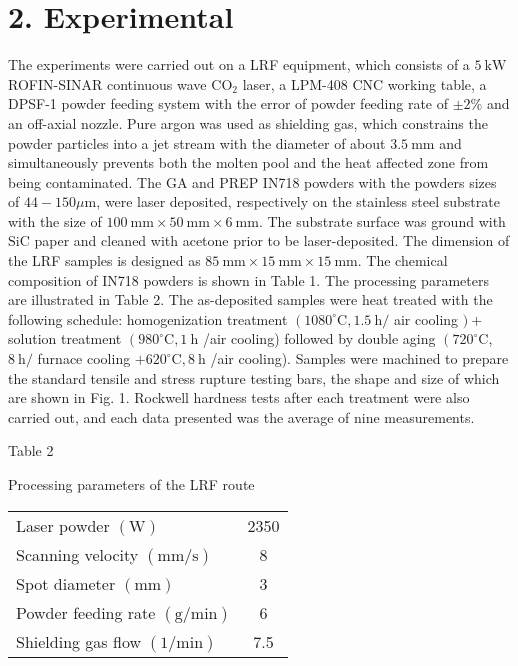 \documentclass[10pt]{article}
\begin{document}
\section*{2. Experimental}
The experiments were carried out on a LRF equipment, which consists of a $5 \mathrm{~kW}$ ROFIN-SINAR continuous wave $\mathrm{CO}_{2}$ laser, a LPM-408 CNC working table, a DPSF-1 powder feeding system with the error of powder feeding rate of $\pm 2 \%$ and an off-axial nozzle. Pure argon was used as shielding gas, which constrains the powder particles into a jet stream with the diameter of about $3.5 \mathrm{~mm}$ and simultaneously prevents both the molten pool and the heat affected zone from being contaminated. The GA and PREP IN718 powders with the powders sizes of $44-150 \mu \mathrm{m}$, were laser deposited, respectively on the stainless steel substrate with the size of $100 \mathrm{~mm} \times 50 \mathrm{~mm} \times 6 \mathrm{~mm}$. The substrate surface was ground with $\mathrm{SiC}$ paper and cleaned with acetone prior to be laser-deposited. The dimension of the LRF samples is designed as $85 \mathrm{~mm} \times 15 \mathrm{~mm} \times 15 \mathrm{~mm}$. The chemical composition of IN718 powders is shown in Table 1. The processing parameters are illustrated in Table 2. The as-deposited samples were heat treated with the following schedule: homogenization treatment $\left(1080^{\circ} \mathrm{C}, 1.5 \mathrm{~h} /\right.$ air cooling $)+$ solution treatment $\left(980^{\circ} \mathrm{C}, 1 \mathrm{~h}\right.$ /air cooling) followed by double aging $\left(720^{\circ} \mathrm{C}\right.$, $8 \mathrm{~h} /$ furnace cooling $+620^{\circ} \mathrm{C}, 8 \mathrm{~h}$ /air cooling). Samples were machined to prepare the standard tensile and stress rupture testing bars, the shape and size of which are shown in Fig. 1. Rockwell hardness tests after each treatment were also carried out, and each data presented was the average of nine measurements.

Table 2

Processing parameters of the LRF route

\begin{center}
\begin{tabular}{lc}
\hline
Laser powder $(\mathrm{W})$ & 2350 \\
Scanning velocity $(\mathrm{mm} / \mathrm{s})$ & 8 \\
Spot diameter $(\mathrm{mm})$ & 3 \\
Powder feeding rate $(\mathrm{g} / \mathrm{min})$ & 6 \\
Shielding gas flow $(1 / \mathrm{min})$ & 7.5 \\
\hline
\end{tabular}
\end{center}
\end{document}
